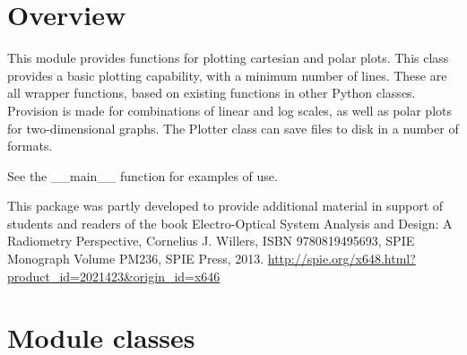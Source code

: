 \documentclass[a4paper,10pt,english]{sphinxmanual}
\begin{document}
\section{Overview}
\label{ryplot:overview}\label{ryplot:module-pyradi.ryplot}
This module provides functions for plotting cartesian and polar plots.
This class provides a basic plotting capability, with a minimum
number of lines. These are all wrapper functions,
based on existing functions in other Python classes.
Provision is made for combinations of linear and log scales, as well
as polar plots for two-dimensional graphs.
The Plotter class can save files to disk in a number of formats.

See the \_\_main\_\_ function for examples of use.

This package was partly developed to provide additional material in support of students 
and readers of the book Electro-Optical System Analysis and Design: A Radiometry 
Perspective,  Cornelius J. Willers, ISBN 9780819495693, SPIE Monograph Volume
PM236, SPIE Press, 2013.  \href{http://spie.org/x648.html?product\_id=2021423\&origin\_id=x646}{http://spie.org/x648.html?product\_id=2021423\&origin\_id=x646}


\section{Module classes}
\label{ryplot:module-classes}
\end{document}
